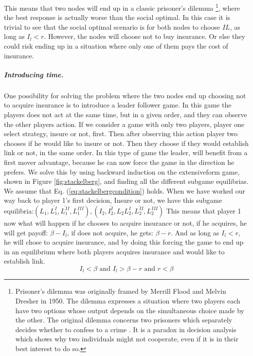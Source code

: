 This means that two nodes will end up in a classic prisoner's dilemma
\footnote{Prisoner's dilemma was originally framed by Merrill Flood and Melvin Dresher in 1950. The dilemma expresses a situation where two players each have two options whose output depends on the simultaneous choice made by the other. The original dilemma concerns two prisoners which separately decides whether to confess to a crime \cite{oxfordPrisonersDilemma}.
It is a paradox in decision analysis which shows why two individuals might not cooperate, even if it is in their best interest to do so.}, where the best response is actually worse than the social optimal. In this case it is trivial to see that the social optimal scenario is for both nodes to choose $IL$, as long as $I_{l}<r$. However, the nodes will choose not to buy insurance. Or else they could risk ending up in a situation where only one of them pays the cost of insurance. 

  
\subparagraph{Introducing time.}
\label{sec:introducing-time}
One possibility for solving the problem where the two nodes end up choosing not to acquire insurance is to introduce a leader follower game. In this game the players does not act at the same time, but in a given order, and they can observe the other players action.
If we consider a game with only two players, player one select strategy, insure or not, first. Then after observing this action player two chooses if he would like to insure or not. Then they choose if they would establish link or not, in the same order.
In this type of game the leader, will benefit from a first mover advantage, because he can now force the game in the direction he prefers.
We solve this by using backward induction on the extensiveform game, shown in Figure \ref{fig:stackelberg}, and finding all the different subgame equilibrias. We assume that Eq. (\ref{eq:stackelbergcondition}) holds. When we have worked our way back to player 1's first decision, Insure or not, we have this subgame equilibria:$(L_{1},\overline{L^{I}_{1}},\overline{L^{II}_{1}},L^{III}_{1}), (I_{2},\overline{I^{I}_{2}},L_{2}L^{I}_{2},\overline{L^{II}_{2}},L^{III}_{2})$
This means that player 1 now what will happen if he chooses to acquire insurance or not, if he acquires, he will get payoff: $\beta-I_{l}$, if does not acquire, he gets: $\beta-r$. And as long as $I_{l}<r$, he will chose to acquire insurance, and by doing this forcing the game to end up in an equilibrium where both players acquires insurance and would like to establish link.
\begin{equation}
I_{l}<\beta \text{ and } I_{l}>\beta-r \text{ and } r<\beta
\label{eq:stackelbergcondition}
\end{equation}

